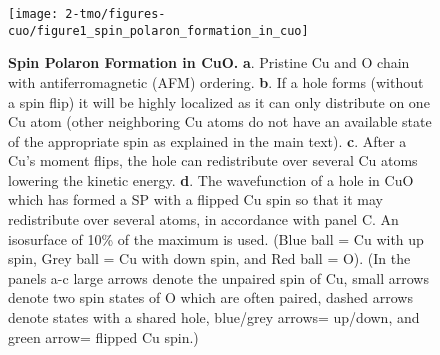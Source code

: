 \begin{figure}
    \centering
    \texttt{[image: 2-tmo/figures-cuo/figure1\_spin\_polaron\_formation\_in\_cuo]}
    \caption{
        \textbf{Spin Polaron Formation in CuO.}
        \textbf{a}. Pristine Cu and O chain with antiferromagnetic (AFM) ordering.
        \textbf{b}. If a hole forms (without a spin flip) it will be highly localized as it can only distribute on one Cu atom (other neighboring Cu atoms do not have an available state of the appropriate spin as explained in the main text).
        \textbf{c}. After a Cu’s moment flips, the hole can redistribute over several Cu atoms lowering the kinetic energy.
        \textbf{d}. The wavefunction of a hole in CuO which has formed a SP with a flipped Cu spin so that it may redistribute over several atoms, in accordance with panel C. An isosurface of 10\% of the maximum is used. (Blue ball = Cu with up spin, Grey ball = Cu with down spin, and Red ball = O). (In the panels a-c large arrows denote the unpaired spin of Cu, small arrows denote two spin states of O which are often paired, dashed arrows denote states with a shared hole, blue/grey arrows= up/down, and green arrow= flipped Cu spin.)
    }
    \label{cuo:fig:formation}
\end{figure}

